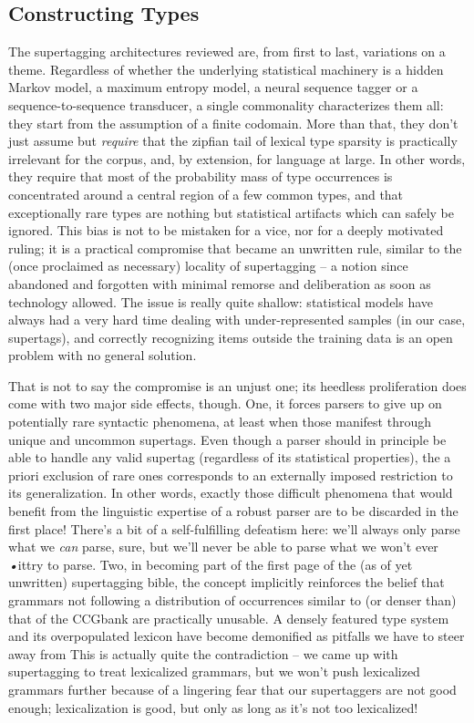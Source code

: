 \subsection{Constructing Types}
The supertagging architectures reviewed are, from first to last, variations on a theme.
Regardless of whether the underlying statistical machinery is a hidden Markov model, a maximum entropy model, a neural sequence tagger or a sequence-to-sequence transducer, a single commonality characterizes them all: they start from the assumption of a finite codomain.
More than that, they don't just assume but \textit{require} that the zipfian tail of lexical type sparsity is practically irrelevant for the corpus, and, by extension, for language at large.
In other words, they require that most of the probability mass of type occurrences is concentrated around a central region of a few common types, and that exceptionally rare types are nothing but statistical artifacts which can safely be ignored.
This bias is not to be mistaken for a vice, nor for a deeply motivated ruling; it is a practical compromise that became an unwritten rule, similar to the (once proclaimed as necessary) locality of supertagging -- a notion since abandoned and forgotten with minimal remorse and deliberation as soon as technology allowed.
The issue is really quite shallow: statistical models have always had a very hard time dealing with under-represented samples (in our case, supertags), and correctly recognizing items outside the training data is an open problem with no general solution.

That is not to say the compromise is an unjust one; its heedless proliferation does come with two major side effects, though.
One, it forces parsers to give up on potentially rare syntactic phenomena, at least when those manifest through unique and uncommon supertags.
Even though a parser should in principle be able to handle any valid supertag (regardless of its statistical properties), the a priori exclusion of rare ones corresponds to an externally imposed restriction to its generalization.
In other words, exactly those difficult phenomena that would benefit from the linguistic expertise of a robust parser are to be discarded in the first place!
There's a bit of a self-fulfilling defeatism here: we'll always only parse what we \textit{can} parse, sure, but we'll never be able to parse what we won't ever \textit{•}it{try} to parse.
Two, in becoming part of the first page of the (as of yet unwritten) supertagging bible, the concept implicitly reinforces the belief that grammars not following a distribution of occurrences similar to (or denser than) that of the CCGbank are practically unusable.
A densely featured type system and its overpopulated lexicon have become demonified as pitfalls we have to steer away from
This is actually quite the contradiction -- we came up with supertagging to treat lexicalized grammars, but we won't push lexicalized grammars further because of a lingering fear that our supertaggers are not good enough; lexicalization is good, but only as long as it's not too lexicalized! 

